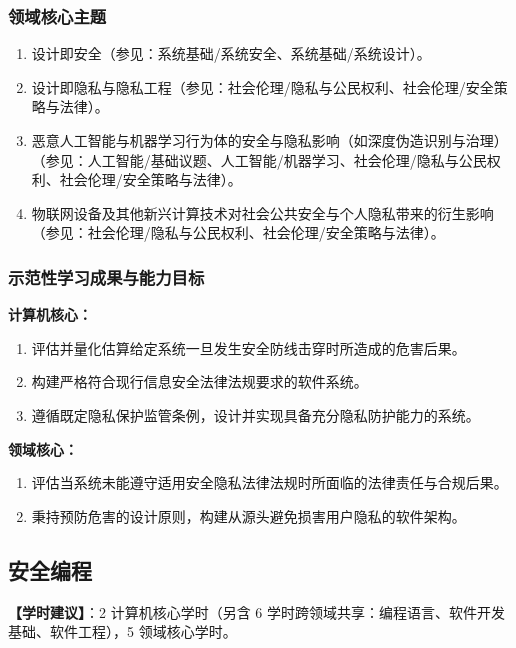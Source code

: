 \subsubsection{领域核心主题}
\begin{enumerate}\setlength{\itemsep}{0pt}\setlength{\parskip}{0pt}\setcounter{enumi}{4}
    \item 设计即安全（参见：系统基础/系统安全、系统基础/系统设计）。
    \item 设计即隐私与隐私工程（参见：社会伦理/隐私与公民权利、社会伦理/安全策略与法律）。
    \item 恶意人工智能与机器学习行为体的安全与隐私影响（如深度伪造识别与治理）（参见：人工智能/基础议题、人工智能/机器学习、社会伦理/隐私与公民权利、社会伦理/安全策略与法律）。
    \item 物联网设备及其他新兴计算技术对社会公共安全与个人隐私带来的衍生影响（参见：社会伦理/隐私与公民权利、社会伦理/安全策略与法律）。
\end{enumerate}

\subsubsection{示范性学习成果与能力目标}
\textbf{计算机核心：}
\begin{enumerate}\setlength{\itemsep}{0pt}\setlength{\parskip}{0pt}
    \item 评估并量化估算给定系统一旦发生安全防线击穿时所造成的危害后果。
    \item 构建严格符合现行信息安全法律法规要求的软件系统。
    \item 遵循既定隐私保护监管条例，设计并实现具备充分隐私防护能力的系统。
\end{enumerate}
\textbf{领域核心：}
\begin{enumerate}\setlength{\itemsep}{0pt}\setlength{\parskip}{0pt}\setcounter{enumi}{3}
    \item 评估当系统未能遵守适用安全隐私法律法规时所面临的法律责任与合规后果。
    \item 秉持预防危害的设计原则，构建从源头避免损害用户隐私的软件架构。
\end{enumerate}

\subsection{安全编程}
\textbf{【学时建议】}：2 计算机核心学时（另含 6 学时跨领域共享：编程语言、软件开发基础、软件工程），5 领域核心学时。

